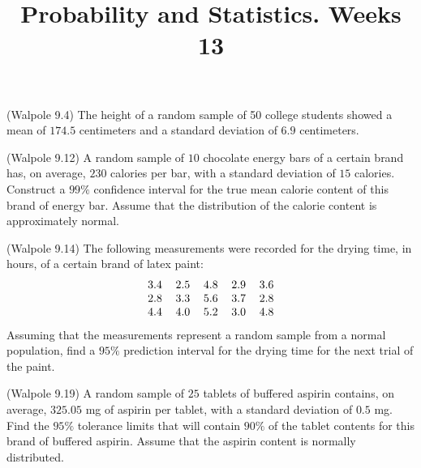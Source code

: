 \documentclass[14pt]{exam}
\title{Probability and Statistics. Weeks 13}
\date{}
\begin{document}
	\maketitle
	
	\begin{questions}
		\question
		(Walpole 9.4)
		The height of a random sample of 50 college students showed a mean of $174.5$ centimeters and a standard deviation of $6.9$ centimeters.
		
		
		\question
		(Walpole 9.12)
		A random sample of $10$ chocolate energy bars of a certain brand has, on average, $230$ calories per bar,
		with a standard deviation of $15$ calories. Construct a $99\%$ confidence interval for the true mean calorie content of this brand of energy bar. Assume that the distribution of the calorie content is approximately normal.
		
		\question
		(Walpole 9.14)
		The following measurements were recorded for the drying time, in hours, of a certain brand of latex paint:
		$$
		\begin{tabular}{ccccc}
		3.4 & 2.5 & 4.8 & 2.9 & 3.6\\
		2.8 & 3.3 & 5.6 & 3.7 & 2.8\\
		4.4 & 4.0 & 5.2 & 3.0 & 4.8\\
		
		\end{tabular}
		$$
		Assuming that the measurements represent a random sample from a normal population, find a $95\%$ prediction interval for the drying time for the next trial of the paint.
		
		\question
		(Walpole 9.19)
		A random sample of $25$ tablets of buffered aspirin contains, on average, $325.05$ mg of aspirin per tablet, with a standard deviation of $0.5$ mg. Find the $95\%$ tolerance limits that will contain $90\%$ of the tablet contents for this brand of buffered aspirin. Assume that the aspirin content is normally distributed.
		

\end{questions}
\end{document}
